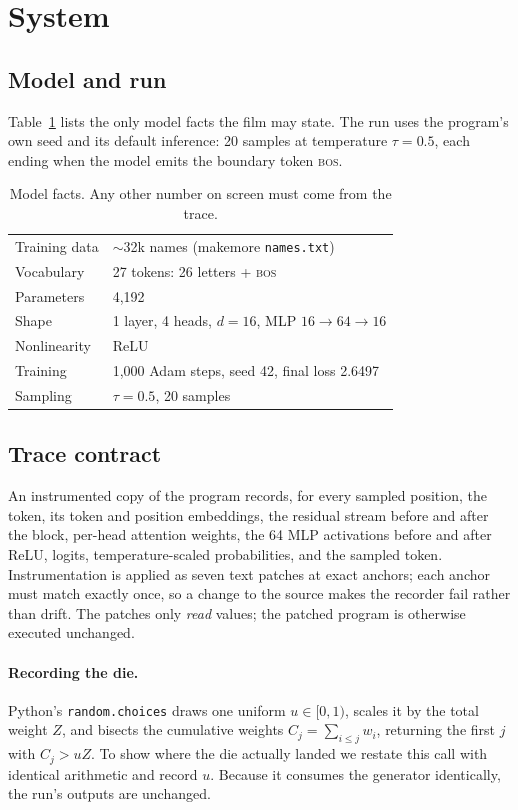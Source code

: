 \documentclass[10pt,twocolumn]{article}
\newcommand{\tok}[1]{\texttt{#1}}
\begin{document}
\section{System}
\subsection{Model and run}
Table~\ref{tab:model} lists the only model facts the film may state.
The run uses the program's own seed and its default inference: 20 samples at temperature $\tau=0.5$,
each ending when the model emits the boundary token \textsc{bos}.

\begin{table}[t]
\centering\small
\begin{tabular}{@{}ll@{}}
\toprule
Training data & ${\sim}$32k names (makemore \tok{names.txt}) \\
Vocabulary & 27 tokens: 26 letters + \textsc{bos} \\
Parameters & 4{,}192 \\
Shape & 1 layer, 4 heads, $d=16$, MLP $16{\to}64{\to}16$ \\
Nonlinearity & ReLU \\
Training & 1{,}000 Adam steps, seed 42, final loss 2.6497 \\
Sampling & $\tau = 0.5$, 20 samples \\
\bottomrule
\end{tabular}
\caption{Model facts. Any other number on screen must come from the trace.}
\label{tab:model}
\end{table}

\subsection{Trace contract}\label{sec:trace}
An instrumented copy of the program records, for every sampled position, the token, its token and position
embeddings, the residual stream before and after the block, per-head attention weights,
the 64 MLP activations before and after ReLU, logits, temperature-scaled probabilities, and the sampled token.
Instrumentation is applied as seven text patches at exact anchors; each anchor must match exactly once,
so a change to the source makes the recorder fail rather than drift.
The patches only \emph{read} values; the patched program is otherwise executed unchanged.

\paragraph{Recording the die.}
Python's \tok{random.choices} draws one uniform $u\in[0,1)$, scales it by the total weight $Z$, and
bisects the cumulative weights $C_j=\sum_{i\le j} w_i$, returning the first $j$ with $C_j > uZ$.
To show where the die actually landed we restate this call with identical arithmetic and record $u$.
Because it consumes the generator identically, the run's outputs are unchanged.
\end{document}
